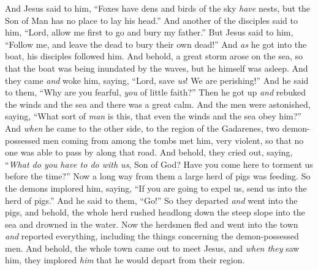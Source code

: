 \begin{biblechapter}
\verse And Jesus said to him, “Foxes have dens and birds of the sky \textit{have} nests, but the Son of Man has no place to lay his head.”
\verse And another of the disciples said to him, “Lord, allow me first to go and bury my father.”
\verse But Jesus said to him, “Follow me, and leave the dead to bury their own dead!”
 And \textit{as} he got into the boat, his disciples followed him.
\verse And behold, a great storm arose on the sea, so that the boat was being inundated by the waves, but he himself was asleep.
\verse And they came \textit{and} woke him, saying, “Lord, save \textit{us}! We are perishing!”
\verse And he said to them, “Why are you fearful, \textit{you} of little faith?” Then he got up \textit{and} rebuked the winds and the sea and there was a great calm.
\verse And the men were astonished, saying, “What sort of \textit{man} is this, that even the winds and the sea obey him?”
 And \textit{when} he came to the other side, to the region of the Gadarenes, two demon-possessed men coming from among the tombs met him, very violent, so that no one was able to pass by along that road.
\verse And behold, they cried out, saying, “\textit{What do you have to do with us}, Son of God? Have you come here to torment us before the time?”
\verse Now a long way from them a large herd of pigs was feeding.
\verse So the demons implored him, saying, “If you are going to expel us, send us into the herd of pigs.”
\verse And he said to them, “Go!” So they departed \textit{and} went into the pigs, and behold, the whole herd rushed headlong down the steep slope into the sea and drowned in the water.
\verse Now the herdsmen fled and went into the town \textit{and} reported everything, including the things concerning the demon-possessed men.
\verse And behold, the whole town came out to meet Jesus, and \textit{when they} saw him, they implored \textit{him} that he would depart from their region.
\end{biblechapter}

